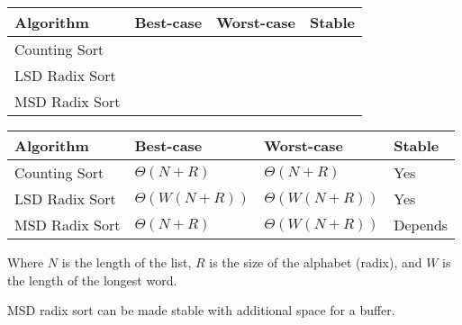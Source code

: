 \ifprintanswers\else
{
\renewcommand{\arraystretch}{2}
\setlength{\tabcolsep}{12pt}
\begin{tabularx}{\textwidth}{Xlll}
Algorithm         & Best-case       & Worst-case          & Stable \\\hline
Counting Sort     &                 &                     &        \\
LSD Radix Sort    &                 &                     &        \\
MSD Radix Sort    &                 &                     &        
\end{tabularx}
}
\fi

\begin{solution}
{
\renewcommand{\arraystretch}{2}
\setlength{\tabcolsep}{12pt}
\begin{tabularx}{\textwidth}{Xlll}
Algorithm         & Best-case          & Worst-case          & Stable \\\hline
Counting Sort     & $\Theta(N + R)$    & $\Theta(N + R)$     & Yes    \\
LSD Radix Sort    & $\Theta(W(N + R))$ & $\Theta(W(N + R))$  & Yes    \\
MSD Radix Sort    & $\Theta(N + R)$    & $\Theta(W(N + R))$  & Depends
\end{tabularx}
}

Where $N$ is the length of the list, $R$ is the size of the alphabet (radix), and $W$ is the length of the longest word.

MSD radix sort can be made stable with additional space for a buffer.
\end{solution}

\vspace{\parskip}
